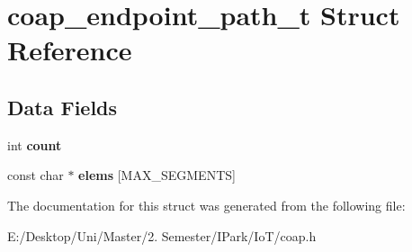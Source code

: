 \hypertarget{structcoap__endpoint__path__t}{}\section{coap\+\_\+endpoint\+\_\+path\+\_\+t Struct Reference}
\label{structcoap__endpoint__path__t}
\subsection*{Data Fields}
\begin{DoxyCompactItemize}
\item 
\mbox{\label{structcoap__endpoint__path__t_ad43c3812e6d13e0518d9f8b8f463ffcf}} 
int {\bfseries count}
\item 
\mbox{\label{structcoap__endpoint__path__t_a64b5df08177bc71813c20021e9b1cf6b}} 
const char $\ast$ {\bfseries elems} \mbox{[}M\+A\+X\+\_\+\+S\+E\+G\+M\+E\+N\+TS\mbox{]}
\end{DoxyCompactItemize}


The documentation for this struct was generated from the following file\+:\begin{DoxyCompactItemize}
\item 
E\+:/\+Desktop/\+Uni/\+Master/2. Semester/\+I\+Park/\+Io\+T/coap.\+h\end{DoxyCompactItemize}
